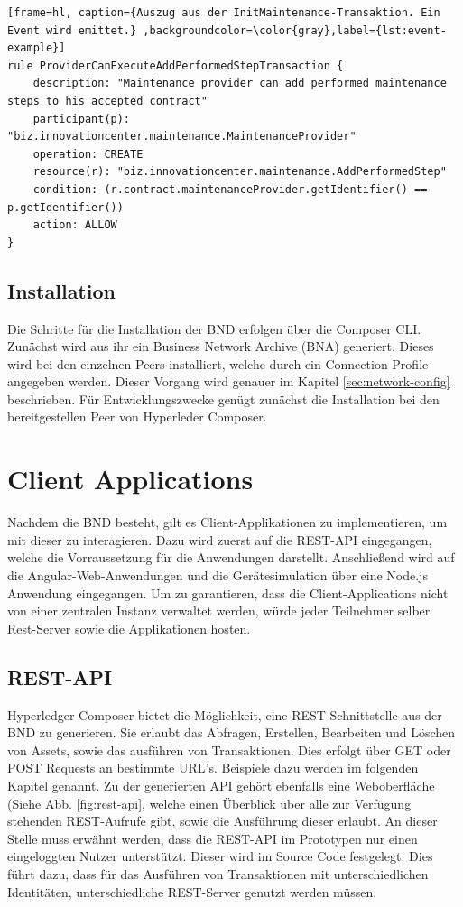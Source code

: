 \begin{lstfloat}
\begin{lstlisting}[frame=hl, caption={Auszug aus der InitMaintenance-Transaktion. Ein Event wird emittet.} ,backgroundcolor=\color{gray},label={lst:event-example}]
rule ProviderCanExecuteAddPerformedStepTransaction {
    description: "Maintenance provider can add performed maintenance steps to his accepted contract"
    participant(p): "biz.innovationcenter.maintenance.MaintenanceProvider"
    operation: CREATE
    resource(r): "biz.innovationcenter.maintenance.AddPerformedStep"
    condition: (r.contract.maintenanceProvider.getIdentifier() == p.getIdentifier())
    action: ALLOW
}
\end{lstlisting} 
\end{lstfloat}

\subsection{Installation}
Die Schritte für die Installation der BND erfolgen über die Composer CLI. Zunächst wird aus ihr ein Business Network Archive (BNA) generiert. Dieses wird bei den einzelnen Peers installiert, welche durch ein Connection Profile angegeben werden. Dieser Vorgang wird genauer im Kapitel \ref{sec:network-config} beschrieben. Für Entwicklungszwecke genügt zunächst die Installation bei den bereitgestellen Peer von Hyperleder Composer.

\section{Client Applications}
Nachdem die BND besteht, gilt es Client-Applikationen zu implementieren, um mit dieser zu interagieren. Dazu wird zuerst auf die REST-API eingegangen, welche die Vorraussetzung für die Anwendungen darstellt. Anschließend wird auf die Angular-Web-Anwendungen und die Gerätesimulation über eine Node.js Anwendung eingegangen. Um zu garantieren, dass die Client-Applications nicht von einer zentralen Instanz verwaltet werden, würde jeder Teilnehmer selber Rest-Server sowie die Applikationen hosten.

\subsection{REST-API}
\label{subsec:REST}
Hyperledger Composer bietet die Möglichkeit, eine REST-Schnittstelle aus der BND zu generieren. Sie erlaubt das Abfragen, Erstellen, Bearbeiten und Löschen von Assets, sowie das ausführen von Transaktionen. Dies erfolgt über GET oder POST Requests an bestimmte URL's. Beispiele dazu werden im folgenden Kapitel genannt. Zu der generierten API gehört ebenfalls eine Weboberfläche (Siehe Abb. \ref{fig:rest-api}, welche einen Überblick über alle zur Verfügung stehenden REST-Aufrufe gibt, sowie die Ausführung dieser erlaubt. An dieser Stelle muss erwähnt werden, dass die REST-API im Prototypen nur einen eingeloggten Nutzer unterstützt. Dieser wird im Source Code festgelegt. Dies führt dazu, dass für das Ausführen von Transaktionen mit unterschiedlichen Identitäten, unterschiedliche REST-Server genutzt werden müssen.


